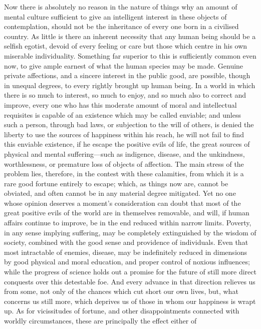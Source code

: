 Now there is absolutely no reason in the nature of things why an
amount of mental culture sufficient to give an intelligent interest in
these objects of contemplation, should not be the inheritance of every
one born in a civilised country. As little is there an inherent
necessity that any human being should be a selfish egotist, devoid of
every feeling or care but those  which centre in his own
miserable individuality. Something far superior to this is
sufficiently common even now, to give ample earnest of what the human
species may be made. Genuine private affections, and a sincere
interest in the public good, are possible, though in unequal degrees,
to every rightly brought up human being. In a world in which there is
so much to interest, so much to enjoy, and so much also to correct
and improve, every one who has this moderate amount of moral and
intellectual requisites is capable of an existence which may be called
enviable; and unless such a person, through bad laws, or subjection to
the will of others, is denied the liberty to use the sources of
happiness within his reach, he will not fail to find this enviable
existence, if he escape the positive evils of life, the great sources
of physical and mental suf\-fer\-ing---such as indigence, disease, and
the unkindness, worthlessness, or premature loss of objects of
affection. The main stress of the problem lies, therefore, in the
contest with these calamities, from which it is a rare good fortune
entirely to escape; which, as things now are, cannot be obviated, and
often cannot be in any material degree mitigated. Yet no one whose
opinion deserves a moment's consideration can doubt that most of the
great positive evils of the world are in themselves removable, and
will, if human affairs continue to improve, be in the end reduced
within narrow limits. Poverty, in any sense implying suffering, may be
completely extinguished by the wisdom of society, combined with the
good sense and providence of individuals. Even that most intractable
of enemies, disease, may be indefinitely reduced in dimensions by good
physical and moral education,  and proper control of noxious
influences; while the progress of science holds out a promise for the
future of still more direct conquests over this detestable foe. And
every advance in that direction relieves us from some, not only of
the chances which cut short our own lives, but, what concerns us still
more, which deprives us of those in whom our happiness is wrapt up. As
for vicissitudes of fortune, and other disappointments connected with
worldly circumstances, these are principally the effect either of
